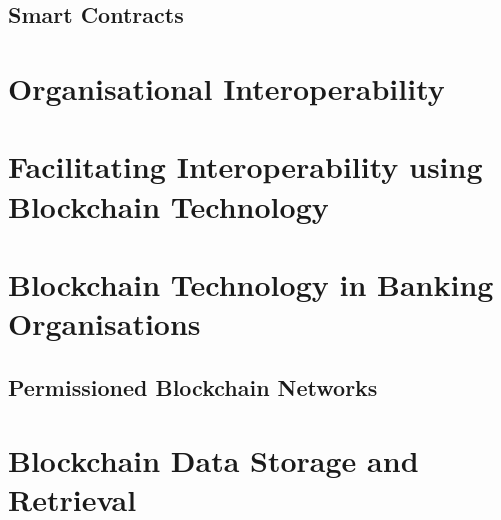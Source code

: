 \subsection{Smart Contracts}

\section{Organisational Interoperability}

\section{Facilitating Interoperability using Blockchain Technology}

\section{Blockchain Technology in Banking Organisations}

\subsection{Permissioned Blockchain Networks}

\section{Blockchain Data Storage and Retrieval}